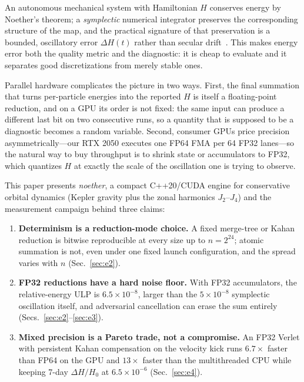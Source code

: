 \documentclass[conference]{IEEEtran}
\begin{document}
An autonomous mechanical system with Hamiltonian $H$ conserves energy by
Noether's theorem; a \emph{symplectic} numerical integrator preserves the
corresponding structure of the map, and the practical signature of that
preservation is a bounded, oscillatory error $\Delta H(t)$ rather than
secular drift~\cite{hairer2006}. This makes energy error both the quality
metric and the diagnostic: it is cheap to evaluate and it separates good
discretizations from merely stable ones.

Parallel hardware complicates the picture in two ways. First, the final
summation that turns per-particle energies into the reported $H$ is itself a
floating-point reduction, and on a GPU its order is not fixed: the same input
can produce a different last bit on two consecutive runs, so a quantity that
is supposed to be a diagnostic becomes a random variable. Second, consumer
GPUs price precision asymmetrically---our RTX 2050 executes one FP64 FMA
per 64 FP32 lanes---so the natural way to buy throughput is to shrink state
or accumulators to FP32, which quantizes $H$ at exactly the scale of the
oscillation one is trying to observe.

This paper presents \textit{noether}, a compact C++20/CUDA engine for
conservative orbital dynamics (Kepler gravity plus the zonal harmonics
$J_2$--$J_4$) and the measurement campaign behind three claims:
\begin{enumerate}
\item \textbf{Determinism is a reduction-mode choice.} A fixed merge-tree or
      Kahan reduction is bitwise reproducible at every size up to
      $n=2^{24}$; atomic summation is not, even under one fixed launch
      configuration, and the spread varies with $n$ (Sec.~\ref{sec:e2}).
\item \textbf{FP32 reductions have a hard noise floor.} With FP32
      accumulators, the relative-energy ULP is $6.5\times10^{-8}$, larger
      than the $5\times10^{-8}$ symplectic oscillation itself, and
      adversarial cancellation can erase the sum entirely
      (Secs.~\ref{sec:e2}--\ref{sec:e3}).
\item \textbf{Mixed precision is a Pareto trade, not a compromise.} An FP32
      Verlet with persistent Kahan compensation on the velocity kick runs
      $6.7\times$ faster than FP64 on the GPU and $13\times$ faster than the
      multithreaded CPU while keeping 7-day $\Delta H/H_0$ at
      $6.5\times10^{-6}$ (Sec.~\ref{sec:e4}).
\end{enumerate}
\end{document}
